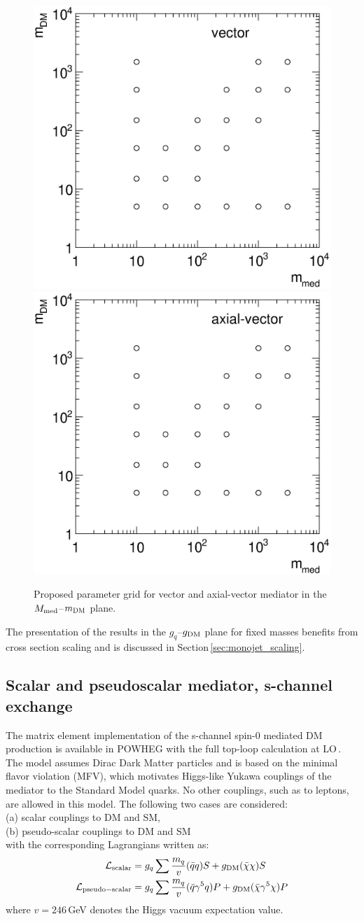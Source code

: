 \begin{figure}
\centering
\includegraphics[width=0.45\linewidth]{figures/monojet/grid_V.eps}
\includegraphics[width=0.45\linewidth]{figures/monojet/grid_A.eps}
\caption{Proposed parameter grid for vector and axial-vector mediator in the $M_{\rm{med}}$--$m_{\rm{DM}}$ plane.}
\label{fig:monojet_grid_V}
\end{figure}

The presentation of the results in the $g_q$--$g_{\rm{DM}}$ plane for fixed masses benefits from cross section scaling and is discussed in Section\,\ref{sec:monojet_scaling}.






\subsection{Scalar and pseudoscalar mediator, s-channel exchange}

The matrix element implementation of the s-channel spin-0 mediated DM production is available in POWHEG with the full top-loop calculation at LO\,\cite{Haisch:2015ioa}.
The model assumes Dirac Dark Matter particles and is based on the minimal flavor violation (MFV), which motivates Higgs-like Yukawa couplings of the mediator to the Standard Model quarks. No other couplings, such as to leptons, are allowed in this model.
The following two cases are considered:\\
(a) scalar couplings to DM and SM,\\
(b) pseudo-scalar couplings to DM and SM\\
\noindent with the corresponding Lagrangians written as:
\begin{align}
\label{eq:SP} 
\mathcal{L}_{\mathrm{scalar}} &= g_q \sum \frac{m_q}{v} (\bar{q}q) S + \gDM (\bar{\chi}\chi) S \\
\mathcal{L}_{\mathrm{pseudo-scalar}} &= g_q \sum \frac{m_q}{v} (\bar{q}\gamma^5q) P + \gDM (\bar{\chi}\gamma^5\chi) P \\
\end{align}
where $v=246$\,GeV denotes the Higgs vacuum expectation value.

